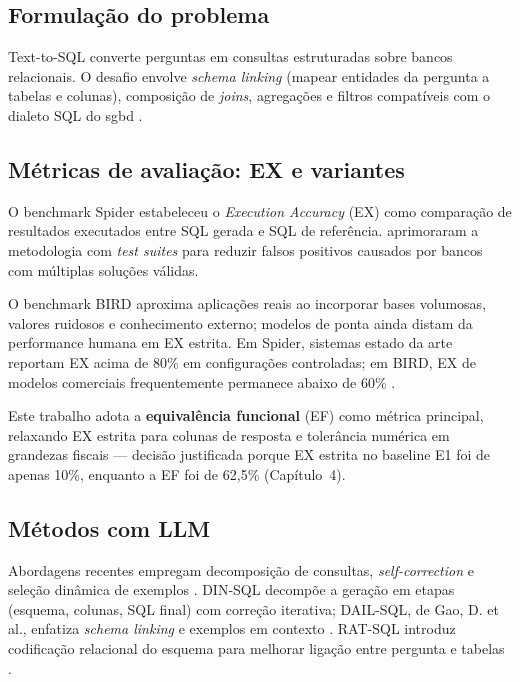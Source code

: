 \subsection{Formulação do problema}

Text-to-SQL converte perguntas em consultas estruturadas sobre bancos relacionais. O desafio envolve \textit{schema linking} (mapear entidades da pergunta a tabelas e colunas), composição de \textit{joins}, agregações e filtros compatíveis com o dialeto SQL do \gls{sgbd} \cite{Yu2018Spider,Wang2020RATSQL}.

\subsection{Métricas de avaliação: EX e variantes}

O benchmark Spider \cite{Yu2018Spider} estabeleceu o \textit{Execution Accuracy} (EX) como comparação de resultados executados entre SQL gerada e SQL de referência.  aprimoraram a metodologia com \textit{test suites} para reduzir falsos positivos causados por bancos com múltiplas soluções válidas.

O benchmark BIRD \cite{Li2024BIRD} aproxima aplicações reais ao incorporar bases volumosas, valores ruidosos e conhecimento externo; modelos de ponta ainda distam da performance humana em EX estrita. Em Spider, sistemas estado da arte reportam EX acima de 80\% em configurações controladas; em BIRD, EX de modelos comerciais frequentemente permanece abaixo de 60\% \cite{Li2024BIRD,Pourreza2024DIN}.

Este trabalho adota a \textbf{equivalência funcional} (EF) como métrica principal, relaxando EX estrita para colunas de resposta e tolerância numérica em grandezas fiscais --- decisão justificada porque EX estrita no baseline E1 foi de apenas 10\%, enquanto a EF foi de 62,5\% (Capítulo~4).

\subsection{Métodos com LLM}

Abordagens recentes empregam decomposição de consultas, \textit{self-correction} e seleção dinâmica de exemplos \cite{Pourreza2024DIN,Gao2024DAILSQL}. DIN-SQL decompõe a geração em etapas (esquema, colunas, SQL final) com correção iterativa; DAIL-SQL, de Gao, D. et al., enfatiza \textit{schema linking} e exemplos em contexto \cite{Gao2024DAILSQL}. RAT-SQL introduz codificação relacional do esquema para melhorar ligação entre pergunta e tabelas \cite{Wang2020RATSQL}.

